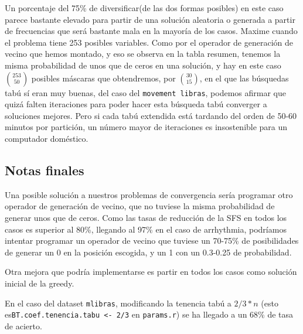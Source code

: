 \documentclass[a4paper,11pt]{article}
\begin{document}
  Un porcentaje del 75\% de diversificar(de las dos formas posibles) en este caso parece bastante
  elevado para partir de una solución aleatoria o generada a partir de frecuencias que será bastante mala en la mayoría de los casos. Maxime cuando el problema
  tiene 253 posibles variables. Como por el operador de generación de vecino que hemos montado, y eso se observa en la tabla
  resumen, tenemos la misma probabilidad de unos que de ceros en una solución, y hay en este caso $\binom{253}{50}$ posibles
  máscaras que obtendremos, por $\binom{30}{15}$, en el que las búsquedas tabú sí eran muy buenas,
  del caso del \texttt{movement libras}, podemos afirmar que quizá falten iteraciones para poder hacer esta búsqueda tabú 
  converger a soluciones mejores. Pero si cada tabú extendida está tardando del orden de 50-60 minutos por partición,
  un número mayor de iteraciones es insostenible para un computador doméstico.
  
  \subsection{Notas finales}
  
  Una posible solución a nuestros problemas de convergencia sería programar otro operador de generación de vecino, que
  no tuviese la misma probabilidad de generar unos que de ceros. Como las tasas de reducción de la SFS en todos los casos
  es superior al 80\%, llegando al 97\% en el caso de arrhythmia, podríamos intentar programar un operador de vecino que
  tuviese un 70-75\% de posibilidades de generar un 0 en la posición escogida, y un 1 con un 0.3-0.25 de probabilidad.
  
  Otra mejora que podría implementarse es partir en todos los casos como solución inicial de la greedy.
  
  En el caso del dataset \texttt{mlibras}, modificando la tenencia tabú a $2/3*n$ (esto es\texttt{BT.coef.tenencia.tabu <- 2/3}
  en \texttt{params.r}) se ha llegado a un 68\% de tasa de acierto.
  
  
\end{document}
